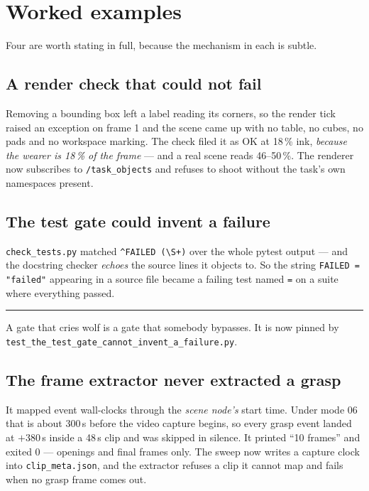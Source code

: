\documentclass[11pt,a4paper,oneside]{report}
\newcommand{\code}[1]{\texttt{\small #1}}
\newcommand{\file}[1]{\texttt{\small #1}}
\newcommand{\keyfact}[1]{%
  \par\vspace{7pt}\noindent
  \hspace*{0pt}\textcolor{srlblue}{\rule{2.5pt}{\dimexpr\baselineskip\relax}}%
  \hspace{9pt}%
  \begin{minipage}[t]{\dimexpr\textwidth-14pt\relax}
  \small #1
  \end{minipage}\par\vspace{7pt}}
\begin{document}
\section{Worked examples}

Four are worth stating in full, because the mechanism in each is subtle.

\subsection{A render check that could not fail}

Removing a bounding box left a label reading its corners, so the render tick
raised an exception on frame 1 and the scene came up with no table, no cubes,
no pads and no workspace marking. The check filed it as OK at 18\,\% ink,
\emph{because the wearer is 18\,\% of the frame} --- and a real scene reads
46--50\,\%. The renderer now subscribes to \code{/task\_objects} and refuses to
shoot without the task's own namespaces present.

\subsection{The test gate could invent a failure}

\code{check\_tests.py} matched \code{\^{}FAILED (\textbackslash S+)} over the
whole pytest output --- and the docstring checker \emph{echoes} the source lines
it objects to. So the string \code{FAILED = "failed"} appearing in a source file
became a failing test named \code{=} on a suite where everything passed.

\keyfact{A gate that cries wolf is a gate that somebody bypasses. It is now
pinned by \file{test\_the\_test\_gate\_cannot\_invent\_a\_failure.py}.}

\subsection{The frame extractor never extracted a grasp}

It mapped event wall-clocks through the \emph{scene node's} start time. Under
mode 06 that is about 300\,s before the video capture begins, so every grasp
event landed at $+380$\,s inside a 48\,s clip and was skipped in silence. It
printed ``10 frames'' and exited 0 --- openings and final frames only. The
sweep now writes a capture clock into \file{clip\_meta.json}, and the extractor
refuses a clip it cannot map and fails when no grasp frame comes out.
\end{document}
